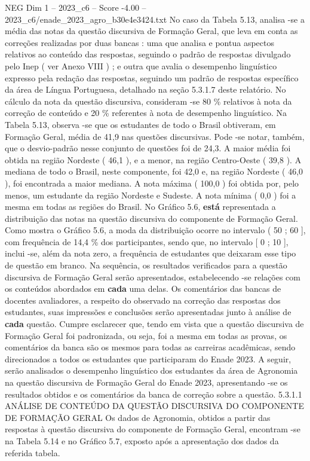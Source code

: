 \begin{textsample}{NEG Dim 1 – 2023\_c6 – Score -4.00 – 2023\_c6/enade\_2023\_agro\_b30e4e3424.txt}
No caso da Tabela 5.13, analisa -se a média das notas da questão discursiva de Formação Geral, que leva em conta as correções realizadas por duas bancas : uma que analisa e pontua aspectos relativos ao conteúdo das respostas, seguindo o padrão de respostas divulgado pelo Inep ( ver Anexo VIII ) ; e outra que avalia o desempenho linguístico expresso pela redação das respostas, seguindo um padrão de respostas específico da área de Língua Portuguesa, detalhado na seção 5.3.1.7 deste relatório.
No cálculo da nota da questão discursiva, consideram -se 80 \% relativos à nota da correção de conteúdo e 20 \% referentes à nota de desempenho linguístico.
Na Tabela 5.13, observa -se que os estudantes de todo o Brasil obtiveram, em Formação Geral, média de 41,9 nas questões discursivas.
Pode -se notar, também, que o desvio-padrão nesse conjunto de questões foi de 24,3.
A maior média foi obtida na região Nordeste ( 46,1 ), e a menor, na região Centro-Oeste ( 39,8 ).
A mediana de todo o Brasil, neste componente, foi 42,0 e, na região Nordeste ( 46,0 ), foi encontrada a maior mediana.
A nota máxima ( 100,0 ) foi obtida por, pelo menos, um estudante da região Nordeste e Sudeste.
A nota mínima ( 0,0 ) foi a mesma em todas as regiões do Brasil.
No Gráfico 5.6, \textbf{está} representada a distribuição das notas na questão discursiva do componente de Formação Geral.
Como mostra o Gráfico 5.6, a moda da distribuição ocorre no intervalo ( 50 ; 60 ], com frequência de 14,4 \% dos participantes, sendo que, no intervalo [ 0 ; 10 ], inclui -se, além da nota zero, a frequência de estudantes que deixaram esse tipo de questão em branco.
Na sequência, os resultados verificados para a questão discursiva de Formação Geral serão apresentados, estabelecendo -se relações com os conteúdos abordados em \textbf{cada} uma delas.
Os comentários das bancas de docentes avaliadores, a respeito do observado na correção das respostas dos estudantes, suas impressões e conclusões serão apresentadas junto à análise de \textbf{cada} questão.
Cumpre esclarecer que, tendo em vista que a questão discursiva de Formação Geral foi padronizada, ou seja, foi a mesma em todas as provas, os comentários da banca são os mesmos para todas as carreiras acadêmicas, sendo direcionados a todos os estudantes que participaram do Enade 2023.
A seguir, serão analisados o desempenho linguístico dos estudantes da área de Agronomia na questão discursiva de Formação Geral do Enade 2023, apresentando -se os resultados obtidos e os comentários da banca de correção sobre a questão. 5.3.1.1 ANÁLISE DE CONTEÚDO DA QUESTÃO DISCURSIVA DO COMPONENTE DE FORMAÇÃO GERAL Os dados de Agronomia, obtidos a partir das respostas à questão discursiva do componente de Formação Geral, encontram -se na Tabela 5.14 e no Gráfico 5.7, exposto após a apresentação dos dados da referida tabela.

\end{textsample}
